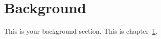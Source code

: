 \chapter{Background}
\label{ch:background}

This is your background section. This is chapter~\ref{ch:background}.